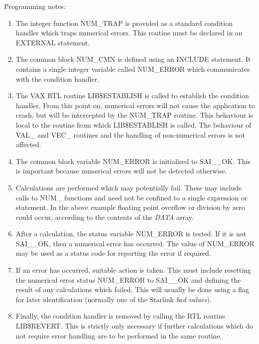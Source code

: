 \documentclass[11pt,nolof]{starlink}
\providecommand{\name}[1]{#1}
\providecommand{\fortvar}[1]{\emph{#1}}
\begin{document}
Programming notes:

\begin{enumerate}

\item The integer function \name{NUM\_TRAP} is provided as a standard
condition handler which traps numerical errors.
This routine must be declared in an EXTERNAL statement.

\item The common block \name{NUM\_CMN} is defined using an \name{INCLUDE}
statement.
It contains a single integer variable called \name{NUM\_ERROR} which
communicates with the condition handler.

\item The \name{VAX} \name{RTL} routine \name{LIB\$ESTABLISH} is called to
establish the condition handler.
From this point on, numerical errors will not cause the application to
crash, but will be intercepted by the \name{NUM\_TRAP} routine.
This behaviour is local to the routine from which \name{LIB\$ESTABLISH} is
called.
The behaviour of \name{VAL\_} and \name{VEC\_} routines and the handling of
non-numerical errors is not affected.

\item The common block variable \name{NUM\_ERROR} is initialised to
\name{SAI\_\_OK}.
This is important because numerical errors will not be detected otherwise.

\item Calculations are performed which may potentially fail.  These may
include calls to \name{NUM\_} functions and need not be confined to a single
expression or statement.
In the above example floating point overflow or division by zero could
occur, according to the contents of the \fortvar{DATA} array.

\item  After a calculation, the status variable \name{NUM\_ERROR} is tested.
If it is not \name{SAI\_\_OK}, then a numerical error has occurred.
The value of \name{NUM\_ERROR} may be used as a status code for reporting
the error if required.

\item  If an error has occurred, suitable action is taken.
This must include resetting the numerical error status \name{NUM\_ERROR} to
\name{SAI\_\_OK} and defining the result of any calculations which failed.
This will usually be done using a flag for later identification (normally
one of the Starlink \emph{bad values}).

\item Finally, the condition handler is removed by calling the \name{RTL}
routine \name{LIB\$REVERT}.  This is strictly only necessary if further
calculations which do not require error handling are to be performed in the
same routine.

\end{enumerate}
\end{document}
